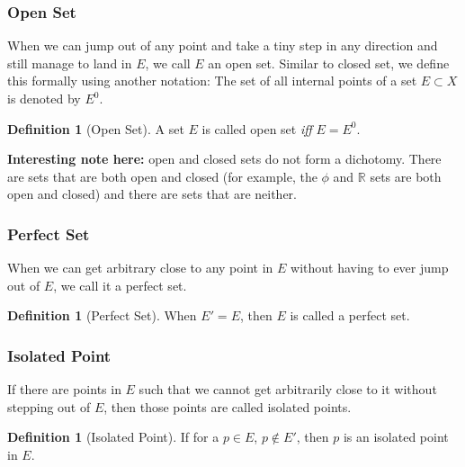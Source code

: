\documentclass{report}
\theoremstyle{plain}
\theoremstyle{definition}
\newtheorem{definition}[theorem]{Definition} %
\begin{document}
\subsubsection{Open Set}
When we can jump out of any point and take a tiny step in any direction and still manage to land in $E$, we call $E$ an open set. Similar to closed set, we define this formally using another notation: The set of all internal points of a set $E\subset X$ is denoted by $E^0$.
\begin{definition}[Open Set]
A set $E$ is called open set \emph{iff} $E=E^0$.
\end{definition}
\noindent\textbf{Interesting note here:} open and closed sets do not form a dichotomy. There are sets that are both open and closed (for example, the $\phi$ and $\mathbb{R}$ sets are both open and closed) and there are sets that are neither.
\subsubsection{Perfect Set}
When we can get arbitrary close to any point in $E$ without having to ever jump out of $E$, we call it a perfect set.
\begin{definition}[Perfect Set]
When $E'=E$, then $E$ is called a perfect set.
\end{definition}
\subsubsection{Isolated Point}
If there are points in $E$ such that we cannot get arbitrarily close to it without stepping out of $E$, then those points are called isolated points.
\begin{definition}[Isolated Point]
If for a $p\in E$, $p\notin E'$, then $p$ is an isolated point in $E$.
\end{definition}
\end{document}
